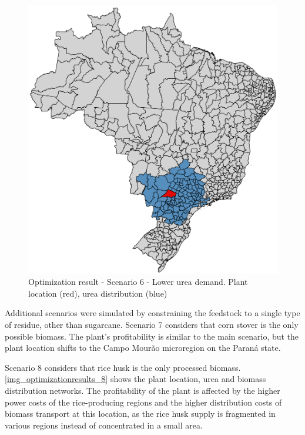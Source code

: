 \documentclass[a4paper, titlepage]{article}
\begin{document}
\begin{figure}
	\includegraphics[width=\textwidth]{img/optimization_result_6.png}
	\caption{Optimization result - Scenario 6 - Lower urea demand. Plant location (red), urea distribution (blue)}
	\label{img_optimizationresults_6}
\end{figure}

Additional scenarios were simulated by constraining the feedstock to a single type of residue, other than sugarcane.
Scenario 7 considers that corn stover is the only possible biomass. The plant's profitability is similar to the main scenario,
but the plant location shifts to the Campo Mourão microregion on the Paraná state. 

Scenario 8 considers that rice husk is the only processed biomass. \autoref{img_optimizationresults_8} shows the plant
location, urea and biomass distribution networks. The profitability of the plant is affected by the 
higher power costs of the rice-producing regions and the higher distribution costs of biomass transport at this location,
as the rice husk supply is fragmented in various regions instead of concentrated in a small area.
\end{document}
